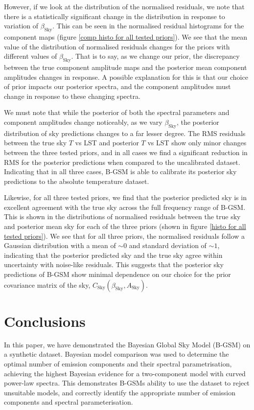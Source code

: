 \documentclass[fleqn,usenatbib]{mnras}
\begin{document}
However, if we look at the distribution of the normalised residuals, we note that there is a statistically significant change in the distribution in response to variation of $\beta_\mathrm{Sky}$. This can be seen in the normalised residual histograms for the component maps (figure \ref{comp histo for all tested priors}). We see that the mean value of the distribution of normalised residuals changes for the priors with different values of $\beta_\mathrm{Sky}$. That is to say, as we change our prior, the discrepancy between the true component amplitude maps and the posterior mean component amplitudes changes in response. A possible explanation for this is that our choice of prior impacts our posterior spectra, and the component amplitudes must change in response to these changing spectra.


We must note that while the posterior of both the spectral parameters and component amplitudes change noticeably, as we vary $\beta_\mathrm{Sky}$, the posterior distribution of sky predictions changes to a far lesser degree. The RMS residuals between the true sky $T$ vs LST and posterior $T$ vs LST show only minor changes between the three tested priors, and in all cases we find a significant reduction in RMS for the posterior predictions when compared to the uncalibrated dataset. Indicating that in all three cases, B-GSM is able to calibrate its posterior sky predictions to the absolute temperature dataset. 

Likewise, for all three tested priors, we find that the posterior predicted sky is in excellent agreement with the true sky across the full frequency range of B-GSM. This is shown in the distributions of normalised residuals between the true sky and posterior mean sky for each of the three priors (shown in figure \ref{histo for all tested priors}). We see that for all three priors, the normalised residuals follow a Gaussian distribution with a mean of $\sim0$ and standard deviation of $\sim1$, indicating that the posterior predicted sky and the true sky agree within uncertainty with noise-like residuals. This suggests that the posterior sky predictions of B-GSM show minimal dependence on our choice for the prior covariance matrix of the sky, $C_\mathrm{Sky}(\beta_\mathrm{Sky},A_\mathrm{Sky})$. 

\section{Conclusions}
In this paper, we have demonstrated the Bayesian Global Sky Model (B-GSM) on a synthetic dataset. Bayesian model comparison was used to determine the optimal number of emission components and their spectral parametrisation, achieving the highest Bayesian evidence for a two-component model with curved power-law spectra. This demonstrates B-GSMs ability to use the dataset to reject unsuitable models, and correctly identify the appropriate number of emission components and spectral parameterisation. 
\end{document}
